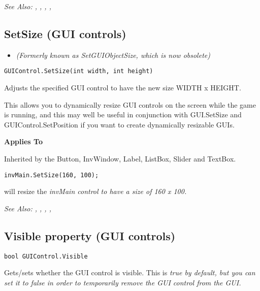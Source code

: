 \it{See Also:} ,
, ,
, 


\subsection{SetSize (GUI controls)}\label{GUIControl.SetSize}%

\begin{itemize}
\item \it{(Formerly known as SetGUIObjectSize, which is now obsolete)}
\end{itemize}

\begin{verbatim}
GUIControl.SetSize(int width, int height)
\end{verbatim}
Adjusts the specified GUI control to have the new size WIDTH x HEIGHT.

This allows you to dynamically resize GUI controls on the screen while the
game is running, and this may well be useful in conjunction with GUI.SetSize and
GUIControl.SetPosition if you want to create dynamically resizable GUIs.

\bf{Applies To}

Inherited by the Button, InvWindow, Label, ListBox, Slider and TextBox.

\begin{verbatim}
invMain.SetSize(160, 100);
\end{verbatim}
will resize the \it{invMain} control to have a size of 160 x 100.

\it{See Also:} ,
,
,
,


\subsection{Visible property (GUI controls)}\label{GUIControl.Visible}%

\begin{verbatim}
bool GUIControl.Visible
\end{verbatim}
Gets/sets whether the GUI control is visible. This is \it{true} by default, but you
can set it to \it{false} in order to temporarily remove the GUI control from the GUI.

